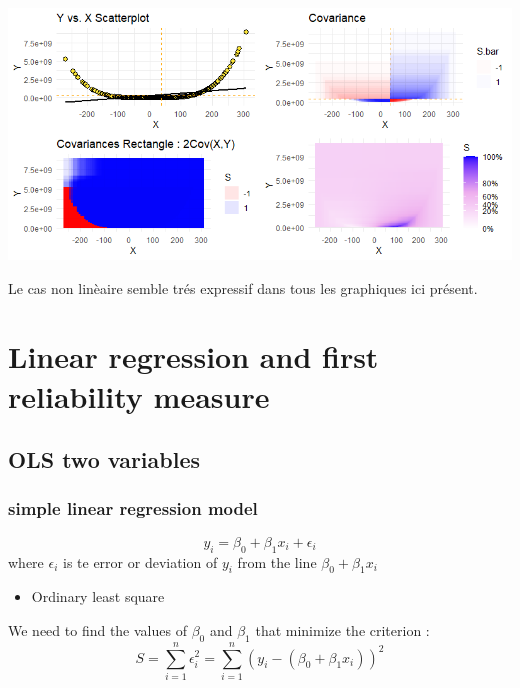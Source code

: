 \documentclass[
]{report}
\providecommand{\tightlist}{%
  \setlength{\itemsep}{0pt}\setlength{\parskip}{0pt}}
\begin{document}
\begin{minipage}{0.45\textwidth}
    \includegraphics{plotetrect_non_linear.png}
\end{minipage} 
\hspace{3.5ex}
\begin{minipage}{0.45\textwidth}
    Le cas non linèaire semble trés expressif dans tous les graphiques ici présent. 
\end{minipage}

\hypertarget{linear-regression-and-first-reliability-measure}{%
\chapter{Linear regression and first reliability measure}\label{linear-regression-and-first-reliability-measure}}

\hypertarget{ols-two-variables}{%
\section{OLS two variables}\label{ols-two-variables}}

\hypertarget{simple-linear-regression-model}{%
\subsection{simple linear regression model}\label{simple-linear-regression-model}}

\[y_i = \beta_0 + \beta_1x_i +  \epsilon_i\]
where \(\epsilon_i\) is te error or deviation of \(y_i\) from the line \(\beta_0 + \beta_1x_i\)

\begin{itemize}
\tightlist
\item
  Ordinary least square
\end{itemize}

We need to find the values of \(\beta_0\) and \(\beta_1\) that minimize the criterion :
\[S = \sum_{i=1}^n \epsilon_i^2 = \sum_{i=1}^n (y_i - (\beta_0 + \beta_1x_i))^2\]
\end{document}
